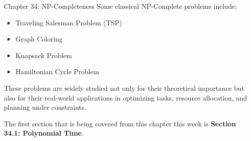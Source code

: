 \begin{notes}{Chapter 34: NP-Completeness}
    Some classical NP-Complete problems include:
    \begin{itemize}
        \item Traveling Salesman Problem (TSP)
        \item Graph Coloring
        \item Knapsack Problem
        \item Hamiltonian Cycle Problem
    \end{itemize}
    
    These problems are widely studied not only for their theoretical importance but also for their real-world applications in optimizing tasks, resource allocation, and planning under constraints.    
\end{notes}

The first section that is being covered from this chapter this week is \textbf{Section 34.1: Polynomial Time}.

